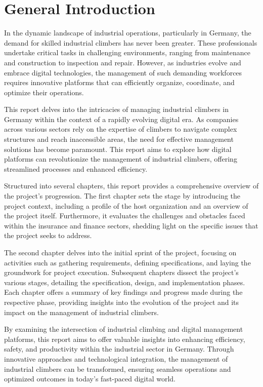 \thispagestyle{plain} %
\section*{General Introduction}

In the dynamic landscape of industrial operations, particularly in Germany, the demand for skilled industrial climbers has never been greater. These professionals undertake critical tasks in challenging environments, ranging from maintenance and construction to inspection and repair. However, as industries evolve and embrace digital technologies, the management of such demanding workforces requires innovative platforms that can efficiently organize, coordinate, and optimize their operations.

This report delves into the intricacies of managing industrial climbers in Germany within the context of a rapidly evolving digital era. As companies across various sectors rely on the expertise of climbers to navigate complex structures and reach inaccessible areas, the need for effective management solutions has become paramount. This report aims to explore how digital platforms can revolutionize the management of industrial climbers, offering streamlined processes and enhanced efficiency.

Structured into several chapters, this report provides a comprehensive overview of the project's progression. The first chapter sets the stage by introducing the project context, including a profile of the host organization and an overview of the project itself. Furthermore, it evaluates the challenges and obstacles faced within the insurance and finance sectors, shedding light on the specific issues that the project seeks to address.

The second chapter delves into the initial sprint of the project, focusing on activities such as gathering requirements, defining specifications, and laying the groundwork for project execution. Subsequent chapters dissect the project's various stages, detailing the specification, design, and implementation phases. Each chapter offers a summary of key findings and progress made during the respective phase, providing insights into the evolution of the project and its impact on the management of industrial climbers.

By examining the intersection of industrial climbing and digital management platforms, this report aims to offer valuable insights into enhancing efficiency, safety, and productivity within the industrial sector in Germany. Through innovative approaches and technological integration, the management of industrial climbers can be transformed, ensuring seamless operations and optimized outcomes in today's fast-paced digital world.
 


\newpage
